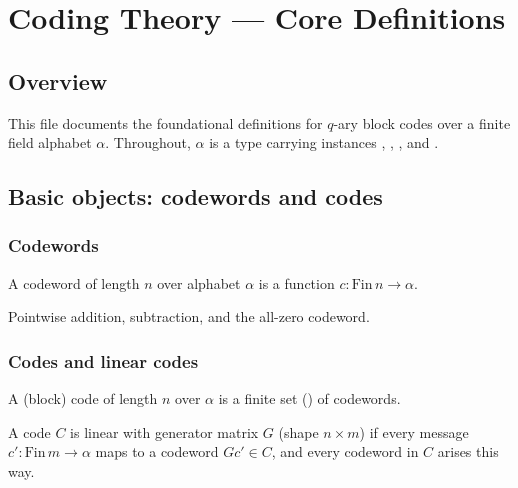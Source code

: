 \chapter{Coding Theory — Core Definitions}
\section{Overview}

This file documents the foundational definitions for $q$-ary block codes over a finite field
alphabet $\alpha$.  Throughout, $\alpha$ is a type carrying instances
\lean{[Fintype α]}, \lean{[Field α]}, \lean{[DecidableEq α]}, and \lean{[Nonempty α]}.

\section{Basic objects: codewords and codes}

\subsection{Codewords}

\begin{definition}[Codeword]
\leanok
A codeword of length $n$ over alphabet $\alpha$ is a function $c : \mathrm{Fin}\,n \to \alpha$.
\end{definition}

\begin{definition}
\leanok
Pointwise addition, subtraction, and the all-zero codeword.
\end{definition}

\subsection{Codes and linear codes}

\begin{definition}[Code]
\leanok
A (block) code of length $n$ over $\alpha$ is a finite set () of codewords.
\end{definition}

\begin{definition}
\leanok
A code $C$ is linear with generator matrix $G$ (shape $n\times m$) if every message
$c':\mathrm{Fin}\,m\to\alpha$ maps to a codeword $Gc'\in C$, and every codeword in $C$
arises this way.
\end{definition}

